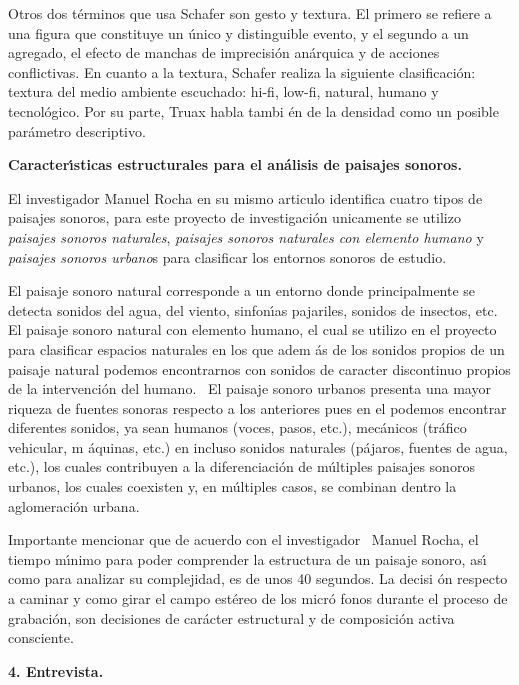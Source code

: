 Otros dos t\'{e}rminos que usa Schafer son gesto y textura. El primero se
refiere a una figura que constituye un \'{u}nico y distinguible evento, y el
segundo a un agregado, el efecto de manchas de imprecisi\'{o}n an\'{a}rquica
y de acciones conflictivas. En cuanto a la textura, Schafer realiza la
siguiente clasificaci\'{o}n: textura del medio ambiente escuchado: hi-fi,
low-fi, natural, humano y tecnol\'{o}gico. Por su parte, Truax habla tambi%
\'{e}n de la densidad como un posible par\'{a}metro descriptivo.

\textbf{ Caracter\'{\i}sticas estructurales para el an\'{a}lisis
de paisajes sonoros. }

El investigador Manuel Rocha en su mismo articulo identifica cuatro tipos de
paisajes sonoros, para este proyecto de investigaci\'{o}n unicamente se
utilizo \textit{paisajes sonoros naturales}, \textit{paisajes sonoros
naturales con elemento humano} y \textit{paisajes sonoros urbano}s para
clasificar los entornos sonoros de estudio.

El paisaje sonoro natural corresponde a un entorno donde principalmente se
detecta sonidos del agua, del viento, sinfon\'{\i}as pajariles, sonidos de
insectos, etc. El paisaje sonoro natural con elemento humano, el cual se
utilizo en el proyecto para clasificar espacios naturales en los que adem%
\'{a}s de los sonidos propios de un paisaje natural podemos encontrarnos con
sonidos de caracter discontinuo propios de la intervenci\'{o}n del humano. \
El paisaje sonoro urbanos presenta una mayor riqueza de fuentes sonoras
respecto a los anteriores pues en el podemos encontrar diferentes sonidos,
ya sean humanos (voces, pasos, etc.), mec\'{a}nicos (tr\'{a}fico vehicular, m%
\'{a}quinas, etc.) en incluso sonidos naturales (p\'{a}jaros, fuentes de
agua, etc.), los cuales contribuyen a la diferenciaci\'{o}n de m\'{u}ltiples
paisajes sonoros urbanos, los cuales coexisten y, en m\'{u}ltiples casos, se
combinan dentro la aglomeraci\'{o}n urbana.

Importante mencionar que de acuerdo con el investigador \ Manuel Rocha, el
tiempo m\'{\i}nimo para poder comprender la estructura de un paisaje sonoro,
as\'{\i} como para analizar su complejidad, es de unos 40 segundos. La decisi%
\'{o}n respecto a caminar y como girar el campo est\'{e}reo de los micr\'{o}%
fonos durante el proceso de grabaci\'{o}n, son decisiones de car\'{a}cter
estructural y de composici\'{o}n activa consciente.

\textbf{4. Entrevista.}

